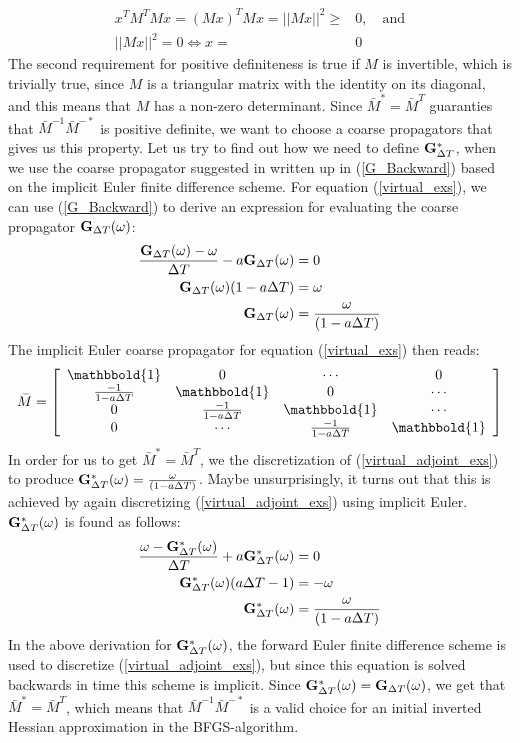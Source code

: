 \documentclass[11pt,a4paper]{article}
\begin{document}
\begin{align*}
x^TM^TMx=(Mx)^TMx=||Mx||^2\geq &0, \quad \textrm{and} \\
||Mx||^2=0 \iff x=&0
\end{align*}
The second requirement for positive definiteness is true if $M$ is invertible, which is trivially true, since $M$ is a triangular matrix with the identity on its diagonal, and this means that $M$ has a non-zero determinant. Since $\bar{M}^*=\bar{M}^T$ guaranties that $\bar{M}^{-1}\bar{M}^{-*}$ is positive definite, we want to choose a coarse propagators that gives us this property. Let us try to find out how we need to define $\bold G_{\Delta T}^*$, when we use the coarse propagator suggested in \cite{lions2001resolution} written up in (\ref{G_Backward}) based on the implicit Euler finite difference scheme. For equation (\ref{virtual_exs}), we can use (\ref{G_Backward}) to derive an expression for evaluating the coarse propagator $\bold G_{\Delta T}(\omega)$:
\begin{align}
\frac{\bold{G}_{\Delta T}(\omega) -\omega}{\Delta T } - a \bold{G}_{\Delta T}(\omega) &= 0 \\
\bold{G}_{\Delta T}(\omega)(1-a\Delta T)&= \omega \\
\bold{G}_{\Delta T}(\omega)&=\frac{\omega}{(1-a\Delta T)}
\end{align}
The implicit Euler coarse propagator for equation (\ref{virtual_exs}) then reads:
\begin{align*}
\bar M = \left[ \begin{array}{cccc}
   	\mathbbold{1} & 0 & \cdots & 0 \\  
   	\frac{-1}{1-a\Delta T} & \mathbbold{1} & 0 & \cdots \\ 
   	0 &\frac{-1}{1-a\Delta T} & \mathbbold{1}  & \cdots \\
   	0 &\cdots &\frac{-1}{1-a\Delta T} & \mathbbold{1}  \\
  	\end{array}  \right]
\end{align*}
In order for us to get $\bar{M}^*=\bar{M}^T$, we the discretization of (\ref{virtual_adjoint_exs}) to produce $\bold{G}_{\Delta T}^*(\omega)=\frac{\omega}{(1-a\Delta T)}$. Maybe unsurprisingly, it turns out that this is achieved by again discretizing (\ref{virtual_adjoint_exs}) using implicit Euler. $\bold{G}_{\Delta T}^*(\omega)$ is found as follows:
\begin{align*}
\frac{\omega-\bold{G}_{\Delta T}^*(\omega)}{\Delta T} + a \bold{G}_{\Delta T}^*(\omega)&=0 \\
\bold{G}_{\Delta T}^*(\omega)(a\Delta T-1)&=-\omega \\
\bold{G}_{\Delta T}^*(\omega)&=\frac{\omega}{(1-a\Delta T)}
\end{align*}
In the above derivation for $\bold{G}_{\Delta T}^*(\omega)$, the forward Euler finite difference scheme is used to discretize (\ref{virtual_adjoint_exs}), but since this equation is solved backwards in time this scheme is implicit. Since $\bold{G}_{\Delta T}^*(\omega)=\bold{G}_{\Delta T}(\omega)$, we get that $\bar{M}^*=\bar{M}^T$, which means that $\bar{M}^{-1}\bar{M}^{-*}$ is a valid choice for an initial inverted Hessian approximation in the BFGS-algorithm.
\end{document}
